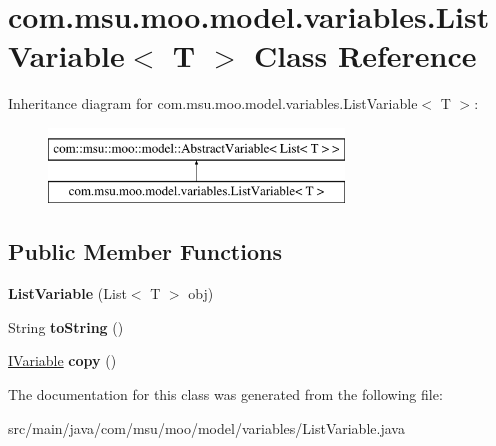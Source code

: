 \hypertarget{classcom_1_1msu_1_1moo_1_1model_1_1variables_1_1ListVariable_3_01T_01_4}{\section{com.\-msu.\-moo.\-model.\-variables.\-List\-Variable$<$ T $>$ Class Reference}
\label{classcom_1_1msu_1_1moo_1_1model_1_1variables_1_1ListVariable_3_01T_01_4}
}
Inheritance diagram for com.\-msu.\-moo.\-model.\-variables.\-List\-Variable$<$ T $>$\-:\begin{figure}[H]
\begin{center}
\leavevmode
\includegraphics[height=2.000000cm]{classcom_1_1msu_1_1moo_1_1model_1_1variables_1_1ListVariable_3_01T_01_4}
\end{center}
\end{figure}
\subsection*{Public Member Functions}
\begin{DoxyCompactItemize}
\item 
\hypertarget{classcom_1_1msu_1_1moo_1_1model_1_1variables_1_1ListVariable_3_01T_01_4_ad428328d5633adb151e789e8eaa41781}{{\bfseries List\-Variable} (List$<$ T $>$ obj)}\label{classcom_1_1msu_1_1moo_1_1model_1_1variables_1_1ListVariable_3_01T_01_4_ad428328d5633adb151e789e8eaa41781}

\item 
\hypertarget{classcom_1_1msu_1_1moo_1_1model_1_1variables_1_1ListVariable_3_01T_01_4_a421be3d632446e271af32b99614d202b}{String {\bfseries to\-String} ()}\label{classcom_1_1msu_1_1moo_1_1model_1_1variables_1_1ListVariable_3_01T_01_4_a421be3d632446e271af32b99614d202b}

\item 
\hypertarget{classcom_1_1msu_1_1moo_1_1model_1_1variables_1_1ListVariable_3_01T_01_4_aaed85224a18f220ebafc07c112230ff6}{\hyperlink{interfacecom_1_1msu_1_1moo_1_1model_1_1interfaces_1_1IVariable}{I\-Variable} {\bfseries copy} ()}\label{classcom_1_1msu_1_1moo_1_1model_1_1variables_1_1ListVariable_3_01T_01_4_aaed85224a18f220ebafc07c112230ff6}

\end{DoxyCompactItemize}


The documentation for this class was generated from the following file\-:\begin{DoxyCompactItemize}
\item 
src/main/java/com/msu/moo/model/variables/List\-Variable.\-java\end{DoxyCompactItemize}
